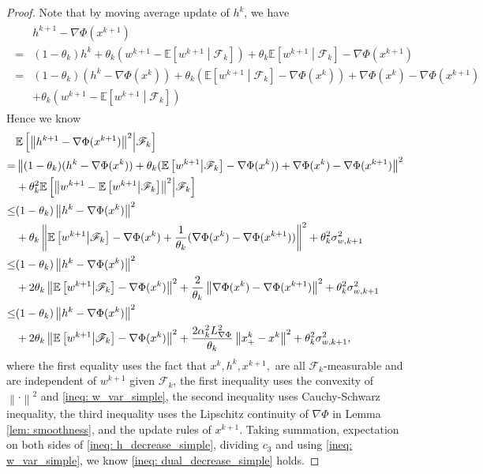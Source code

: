\documentclass[10pt]{article}
\theoremstyle{remark}
\def\setF{\mathscr{F}} %
\newcommand{\E}{\mathbb{E}}
\newcommand{\norm}[1]{\left\|#1\right\|}
\begin{document}
\begin{proof}
    Note that by moving average update of $h^k$, we have
\begin{align}
    \begin{aligned}
        &h^{k+1} - \nabla\Phi(x^{k+1}) \\
        = &(1 - \theta_k)h^k + \theta_k(w^{k+1} - \E\left[w^{k+1}\middle|\setF_k\right]) + \theta_k\E\left[w^{k+1}\middle|\setF_k\right] - \nabla\Phi(x^{k+1})\\
        = &(1 - \theta_k)(h^k - \nabla\Phi(x^k)) + \theta_k(\E\left[w^{k+1}\middle|\setF_k\right] - \nabla\Phi(x^k)) + \nabla\Phi(x^k) - \nabla\Phi(x^{k+1}) \\
        & +  \theta_k(w^{k+1} - \E\left[w^{k+1}\middle|\setF_k\right])
    \end{aligned}
\end{align}
Hence we know 
\begin{align}
        &\E\left[\norm{h^{k+1} - \nabla\Phi(x^{k+1})}^2\middle|\setF_k\right] \notag\\
        = &\norm{(1 - \theta_k)(h^k - \nabla\Phi(x^k)) + \theta_k(\E\left[w^{k+1}\middle|\setF_k\right] - \nabla\Phi(x^k)) + \nabla\Phi(x^k) - \nabla\Phi(x^{k+1})}^2 \notag\\
         &+ \theta_k^2\E\left[\norm{w^{k+1} - \E\left[w^{k+1}\middle|\setF_k\right]}^2\middle|\setF_k\right] \notag\\ 
        \leq &(1 - \theta_k)\norm{h^k - \nabla\Phi(x^k)}^2 \notag\\
        & + \theta_k\norm{\E\left[w^{k+1}\middle|\setF_k\right] - \nabla\Phi(x^k) + \frac{1}{\theta_k}(\nabla\Phi(x^k) - \nabla\Phi(x^{k+1}))}^2 +\theta_k^2\sigma_{w,k+1}^2 \notag\\
        \leq &(1 - \theta_k)\norm{h^k - \nabla\Phi(x^k)}^2 \notag\\
        & + 2\theta_k\norm{\E\left[w^{k+1}\middle|\setF_k\right] - \nabla\Phi(x^k)}^2 + \frac{2}{\theta_k}\norm{\nabla\Phi(x^k) - \nabla\Phi(x^{k+1})}^2 + \theta_k^2\sigma_{w,k+1}^2 \notag\\
        \leq &(1 - \theta_k)\norm{h^k - \nabla\Phi(x^k)}^2 \notag\\
        & + 2\theta_k\norm{\E\left[w^{k+1}\middle|\setF_k\right] - \nabla\Phi(x^k)}^2 + \frac{2\alpha_k^2L_{\nabla \Phi}^2}{\theta_k}\norm{x_+^k - x^k}^2 + \theta_k^2\sigma_{w,k+1}^2,\label{ineq: h_decrease_simple}
\end{align}
where the first equality uses the fact that $x^k, h^k, x^{k+1}, $ are all $\setF_k$-measurable and are independent of $w^{k+1}$ given $\setF_k$, the first inequality uses the convexity of $\norm{\cdot}^2$ and \eqref{ineq: w_var_simple}, the second inequality uses Cauchy-Schwarz inequality, the third inequality uses the Lipschitz continuity of $\nabla\Phi$ in Lemma \ref{lem: smoothness}, and the update rules of $x^{k+1}$. Taking summation, expectation on both sides of \eqref{ineq: h_decrease_simple}, dividing $c_3$ and using \eqref{ineq: w_var_simple}, we know \eqref{ineq: dual_decrease_simple} holds.
\end{proof}
\end{document}
